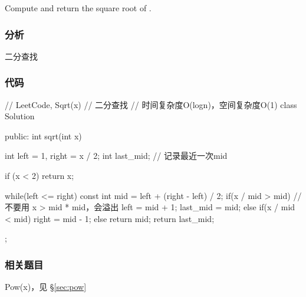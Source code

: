 Compute and return the square root of .


\subsubsection{分析}
二分查找


\subsubsection{代码}
\begin{Code}
// LeetCode, Sqrt(x)
// 二分查找
// 时间复杂度O(logn)，空间复杂度O(1)
class Solution {
public:
    int sqrt(int x) {
        int left = 1, right = x / 2;
        int last_mid;  // 记录最近一次mid

        if (x < 2) return x;

        while(left <= right) {
            const int mid = left + (right - left) / 2;
            if(x / mid > mid) { // 不要用 x > mid * mid，会溢出
                left = mid + 1;
                last_mid = mid;
            } else if(x / mid < mid) {
                right = mid - 1;
            } else {
                return mid;
            }
        }
        return last_mid;
    }
};
\end{Code}


\subsubsection{相关题目}
\begindot
\item Pow(x)，见 \S \ref{sec:pow}
\myenddot

